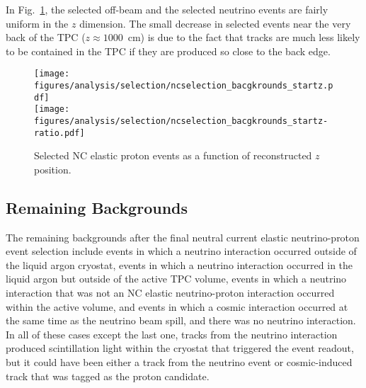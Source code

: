     In Fig.~\ref{fig:ncestartz}, the selected off-beam and the selected
    neutrino events are fairly uniform in the $z$ dimension. The small decrease
    in selected events near the very back of the TPC ($z \approx 1000$~cm) is
    due to the fact that tracks are much less likely to be contained in the TPC
    if they are produced so close to the back edge.
    \begin{figure}[ht]
      \centering
      \texttt{[image: figures/analysis/selection/ncselection\_bacgkrounds\_startz.pdf]} \\
      \texttt{[image: figures/analysis/selection/ncselection\_bacgkrounds\_startz-ratio.pdf]} \\
      \caption{Selected NC elastic proton events as a function of reconstructed $z$ position.}
      \label{fig:ncestartz}
    \end{figure}

    \FloatBarrier

\subsection{Remaining Backgrounds}\label{sec:effbg}
  The remaining backgrounds after the final neutral current elastic
  neutrino-proton event selection include events in which a neutrino
  interaction occurred outside of the liquid argon cryostat, events in which a
  neutrino interaction occurred in the liquid argon but outside of the active
  TPC volume, events in which a neutrino interaction that was not an NC elastic
  neutrino-proton interaction occurred within the active volume, and events in
  which a cosmic interaction occurred at the same time as the neutrino beam
  spill, and there was no neutrino interaction. In all of these cases except
  the last one, tracks from the neutrino interaction produced scintillation
  light within the cryostat that triggered the event readout, but it could have
  been either a track from the neutrino event or cosmic-induced track that was
  tagged as the proton candidate.

